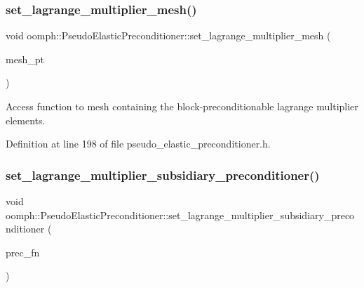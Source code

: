 \subsubsection{\texorpdfstring{set\+\_\+lagrange\+\_\+multiplier\+\_\+mesh()}{set\_lagrange\_multiplier\_mesh()}}
{\footnotesize\ttfamily void oomph\+::\+Pseudo\+Elastic\+Preconditioner\+::set\+\_\+lagrange\+\_\+multiplier\+\_\+mesh (\begin{DoxyParamCaption}\item[{\hyperlink{classoomph_1_1Mesh}{Mesh} $\ast$}]{mesh\+\_\+pt }\end{DoxyParamCaption})\hspace{0.3cm}{\ttfamily [inline]}}



Access function to mesh containing the block-\/preconditionable lagrange multiplier elements. 



Definition at line 198 of file pseudo\+\_\+elastic\+\_\+preconditioner.\+h.

\mbox{\label{classoomph_1_1PseudoElasticPreconditioner_a64865a85f35ae9385f9f8d68e75595e0}} 
\subsubsection{\texorpdfstring{set\+\_\+lagrange\+\_\+multiplier\+\_\+subsidiary\+\_\+preconditioner()}{set\_lagrange\_multiplier\_subsidiary\_preconditioner()}}
{\footnotesize\ttfamily void oomph\+::\+Pseudo\+Elastic\+Preconditioner\+::set\+\_\+lagrange\+\_\+multiplier\+\_\+subsidiary\+\_\+preconditioner (\begin{DoxyParamCaption}\item[{\hyperlink{classoomph_1_1PseudoElasticPreconditioner_a1462e1ef48ed2668c06dfd36c783d1a5}{Subsidiary\+Preconditioner\+Fct\+Pt}}]{prec\+\_\+fn }\end{DoxyParamCaption})\hspace{0.3cm}{\ttfamily [inline]}}



